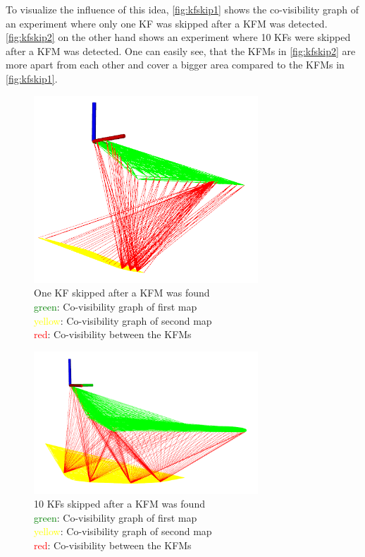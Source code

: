 To visualize the influence of this idea, \autoref{fig:kfskip1} shows the co-visibility graph of an experiment where only one \ac{KF} was skipped after a \ac{KFM} was detected. \autoref{fig:kfskip2} on the other hand shows an experiment where 10 \acp{KF} were skipped after a \ac{KFM} was detected. One can easily see, that the \acp{KFM} in \autoref{fig:kfskip2} are more apart from each other and cover a bigger area compared to the \acp{KFM} in \autoref{fig:kfskip1}.

\begin{figure}[H]
   \centering
   \includegraphics[width=0.75\textwidth]{images/covgraph_minHits_5_skip_1}
   \caption{One \ac{KF} skipped after a \ac{KFM} was found\\
   \textcolor{green}{green}: Co-visibility graph of first map\\ \textcolor{yellow}{yellow}: Co-visibility graph of second map\\ \textcolor{red}{red}: Co-visibility between the \acp{KFM}}
   \label{fig:kfskip1}
\end{figure}

\begin{figure}[H]
   \centering
   \includegraphics[width=0.75\textwidth]{images/covgraph_minHits_5_skip_10}
   \caption{10 \acp{KF} skipped after a \ac{KFM} was found\\
   \textcolor{green}{green}: Co-visibility graph of first map\\ \textcolor{yellow}{yellow}: Co-visibility graph of second map\\ \textcolor{red}{red}: Co-visibility between the \acp{KFM}}
   \label{fig:kfskip2}
\end{figure}

